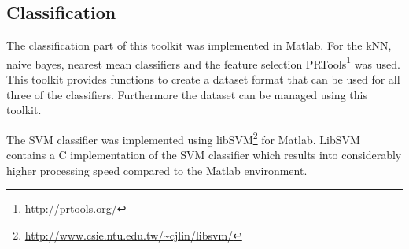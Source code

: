 \subsection{Classification}
The classification part of this toolkit was implemented in Matlab.
For the kNN, naive bayes, nearest mean classifiers and the feature selection PRTools\footnote{http://prtools.org/} \cite{Duin00prtoolsversion} was used.
This toolkit provides functions to create a dataset format that can be used for all three of the classifiers.
Furthermore the dataset can be managed using this toolkit.

The SVM classifier was implemented using libSVM\footnote{\url{http://www.csie.ntu.edu.tw/~cjlin/libsvm/}} \cite{chang2001libsvm} for Matlab.
LibSVM contains a C implementation of the SVM classifier which results into considerably higher processing speed compared to the Matlab environment.

